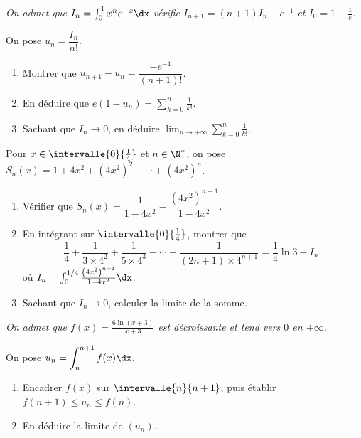 \begin{annales}
\emph{On admet que $I_{n} = \int_{0}^{1}x^{n}e^{-x}\dx$ vérifie
$I_{n+1} = (n+1)I_{n}-e^{-1}$ et $I_{0} = 1-\frac1e$.}

On pose $u_{n} = \dfrac{I_{n}}{n!}$.
\begin{enumerate}[label=\textbf{\alph*)}, leftmargin=*, itemsep=0.15em]
  \item Montrer que $u_{n+1}-u_{n} = \dfrac{-e^{-1}}{(n+1)!}$.
  \item En déduire que
        $e\left(1-u_{n}\right) = \displaystyle\sum_{k=0}^{n}\frac{1}{k!}$.
  \item Sachant que $I_{n} \to 0$, en déduire
        $\displaystyle\lim_{n\to+\infty}\sum_{k=0}^{n}\frac{1}{k!}$.
\end{enumerate}

Pour $x \in \intervalle{0}{\frac14}$ et $n \in \N^{*}$, on pose
$S_{n}(x) = 1+4x^{2}+\left(4x^{2}\right)^{2}+\cdots+\left(4x^{2}\right)^{n}$.
\begin{enumerate}[label=\textbf{\alph*)}, leftmargin=*, itemsep=0.15em]
  \item Vérifier que
        $S_{n}(x) = \dfrac{1}{1-4x^{2}}-\dfrac{\left(4x^{2}\right)^{n+1}}{1-4x^{2}}$.
  \item En intégrant sur $\intervalle{0}{\frac14}$, montrer que
        \[
          \frac14+\frac{1}{3\times4^{2}}+\frac{1}{5\times4^{3}}+\cdots
          +\frac{1}{(2n+1)\times4^{n+1}} = \frac14\ln3-I_{n},
        \]
        où $I_{n} = \int_{0}^{1/4}\frac{\left(4x^{2}\right)^{n+1}}{1-4x^{2}}\dx$.
  \item Sachant que $I_{n} \to 0$, calculer la limite de la somme.
\end{enumerate}

\emph{On admet que $f(x) = \frac{6\ln(x+3)}{x+3}$ est décroissante et tend
vers $0$ en $+\infty$.}

On pose $u_{n} = \displaystyle\int_{n}^{n+1}f(x)\dx$.
\begin{enumerate}[label=\textbf{\alph*)}, leftmargin=*, itemsep=0.15em]
  \item Encadrer $f(x)$ sur $\intervalle{n}{n+1}$, puis établir
        $f(n+1) \leq u_{n} \leq f(n)$.
  \item En déduire la limite de $(u_{n})$.
\end{enumerate}


\end{annales}
